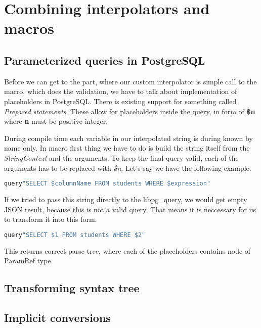 \section{Combining interpolators and macros}
\subsection{Parameterized queries in PostgreSQL}
Before we can get to the part, where our custom interpolator is simple call to the macro, which does the validation, we have to talk about implementation of placeholders in PostgreSQL. There is existing support for something called \textit{Prepared statements}. These allow for placeholders inside the query, in form of \textbf{\$n} where \textbf{n} must be positive integer.  

During compile time each variable in our interpolated string is during known by name only. In macro first thing we have to do is build the string itself from the \textit{StringContext} and the arguments. To keep the final query valid, each of the arguments has to be replaced with \textit{\$n}. 
Let's say we have the following example.
\begin{lstlisting}[language=scala, showstringspaces=false]
query"SELECT $columnName FROM students WHERE $expression"
\end{lstlisting}
If we tried to pass this string directly to the libpg\_query, we would get empty JSON result, because this is not a valid query. That means it is neccessary for us to transform it into this form.
\begin{lstlisting}[language=scala, showstringspaces=false]
query"SELECT $1 FROM students WHERE $2"
\end{lstlisting}
This returns correct parse tree, where each of the placeholders contains node of ParamRef type. 


\subsection{Transforming syntax tree}



\subsection{Implicit conversions}